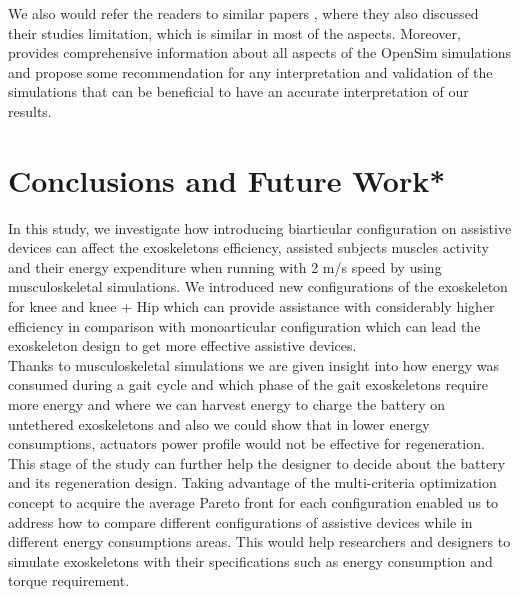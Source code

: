 \documentclass[10pt,letterpaper]{article}
\begin{document}
We also would refer the readers to similar papers \cite{2,93}, where they also discussed their studies limitation, which is similar in most of the aspects. Moreover,\cite{92} provides comprehensive information about all aspects of the OpenSim simulations and propose some recommendation for any interpretation and validation of the simulations that can be beneficial to have an accurate interpretation of our results.
\section*{Conclusions and Future Work*}
In this study, we investigate how introducing biarticular configuration on assistive devices can affect the exoskeletons efficiency, assisted subjects muscles activity and their energy expenditure when running with 2 m/s speed by using musculoskeletal simulations. We introduced new configurations of the exoskeleton for knee and knee + Hip which can provide assistance with considerably higher efficiency in comparison with monoarticular configuration which can lead the exoskeleton design to get more effective assistive devices.\\
Thanks to musculoskeletal simulations we are given insight into how energy was consumed during a gait cycle and which phase of the gait exoskeletons require more energy and where we can harvest energy to charge the battery on untethered exoskeletons and also we could show that in lower energy consumptions, actuators power profile would not be effective for regeneration. This stage of the study can further help the designer to decide about the battery and its regeneration design.
Taking advantage of the multi-criteria optimization concept to acquire the average Pareto front for each configuration enabled us to address how to compare different configurations of assistive devices while in different energy consumptions areas. This would help researchers and designers to simulate exoskeletons with their specifications such as energy consumption and torque requirement.\\
\end{document}
